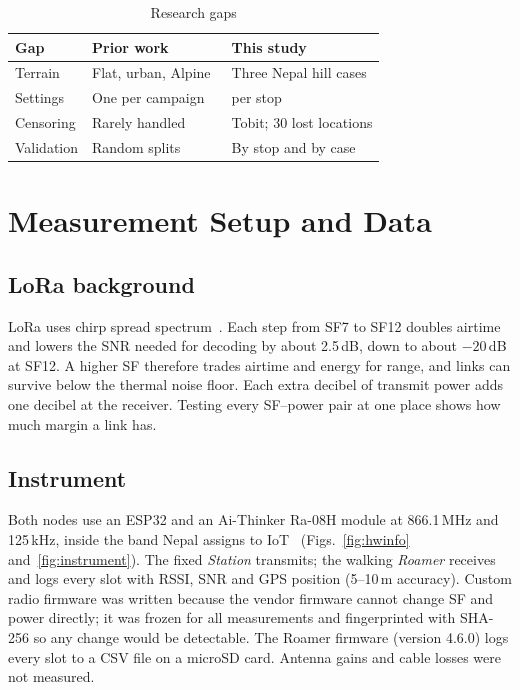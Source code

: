 \documentclass[conference]{IEEEtran}
\newcommand{\dB}{\,dB\xspace}
\begin{document}
\begin{table}[t]
\caption{Research gaps}\label{tab:gap}
\centering
\footnotesize
\setlength{\tabcolsep}{3pt}
\begin{tabular}{@{}>{\raggedright\arraybackslash}p{1.6cm}>{\raggedright\arraybackslash}p{3.1cm}>{\raggedright\arraybackslash}p{3.0cm}@{}}
\toprule
Gap & Prior work & This study \\
\midrule
Terrain & Flat, urban, Alpine~\cite{petajajarvi2015,rademacher2021,bianco2020} & Three Nepal hill cases \\
Settings & One per campaign~\cite{bianco2020} & 18 per stop \\
Censoring & Rarely handled~\cite{gustafson2015} & Tobit; 30 lost locations \\
Validation & Random splits~\cite{bitterling2026} & By stop and by case \\
\bottomrule
\end{tabular}
\end{table}

\section{Measurement Setup and Data}\label{sec:data}

\subsection{LoRa background}
LoRa uses chirp spread spectrum~\cite{semtech_an1200,augustin2016}. Each step from SF7 to SF12 doubles airtime and lowers the SNR needed for decoding by about 2.5\dB, down to about $-20$\dB at SF12. A higher SF therefore trades airtime and energy for range, and links can survive below the thermal noise floor. Each extra decibel of transmit power adds one decibel at the receiver. Testing every SF--power pair at one place shows how much margin a link has.

\subsection{Instrument}
Both nodes use an ESP32 and an Ai-Thinker Ra-08H module at 866.1\,MHz and 125\,kHz, inside the band Nepal assigns to IoT~\cite{nta2023} (Figs.~\ref{fig:hwinfo} and~\ref{fig:instrument}). The fixed \textit{Station} transmits; the walking \textit{Roamer} receives and logs every slot with RSSI, SNR and GPS position (5--10\,m accuracy). Custom radio firmware was written because the vendor firmware cannot change SF and power directly; it was frozen for all measurements and fingerprinted with SHA-256 so any change would be detectable. The Roamer firmware (version 4.6.0) logs every slot to a CSV file on a microSD card. Antenna gains and cable losses were not measured.
\end{document}
